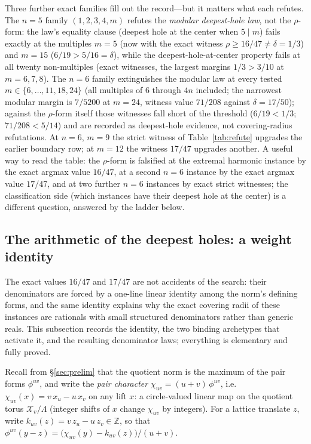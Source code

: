 \documentclass[11pt,a4paper]{article}
\numberwithin{equation}{section}
\theoremstyle{plain}
\theoremstyle{definition}
\theoremstyle{remark}
\newcommand{\Z}{\mathbb{Z}}
\begin{document}
Three further exact families fill out the record---but it matters what
each refutes. The $n=5$ family $(1,2,3,4,m)$ refutes the
\emph{modular deepest-hole law}, not the $\rho$-form: the law's equality
clause (deepest hole at the center when $5\mid m$) fails exactly at the
multiples $m=5$ (now with the exact witness $\rho\ge16/47\ne\delta=1/3$)
and $m=15$ ($6/19>5/16=\delta$), while the deepest-hole-at-center
property fails at all twenty non-multiples (exact witnesses, the largest
margins $1/3>3/10$ at $m=6,7,8$). The $n=6$ family extinguishes the
modular law at every tested $m\in\{6,\dots,11,18,24\}$ (all multiples of
$6$ through $4n$ included; the narrowest modular margin is $7/5200$ at
$m=24$, witness value $71/208$ against $\delta=17/50$); against the
$\rho$-form itself those witnesses fall short of the threshold
($6/19<1/3$; $71/208<5/14$) and are recorded as deepest-hole evidence,
not covering-radius refutations. At $n=6$, $m=9$ the strict witness of
Table~\ref{tab:refute} upgrades the earlier boundary row; at $m=12$ the
witness $17/47$ upgrades another. A useful way to read the table:
the $\rho$-form is falsified at the extremal harmonic instance by the
exact argmax value $16/47$, at a second $n=6$ instance by the exact
argmax value $17/47$, and at
two further $n=6$ instances by exact strict witnesses; the
classification side (which instances have their deepest hole at the
center) is a different question, answered by the ladder below.

\subsection{The arithmetic of the deepest holes: a weight identity}
\label{sec:weights}

The exact values $16/47$ and $17/47$ are not accidents of the search:
their denominators are forced by a one-line linear identity among the
norm's defining forms, and the same identity explains why the exact
covering radii of these instances are rationals with small structured
denominators rather than generic reals. This subsection records the
identity, the two binding archetypes that activate it, and the resulting
denominator laws; everything is elementary and fully proved.

Recall from \S\ref{sec:prelim} that the quotient norm is the maximum of
the pair forms $\phi^{uv}$, and write the \emph{pair character}
$\chi_{uv}=(u{+}v)\,\phi^{uv}$, i.e.\ $\chi_{uv}(x)=v\,x_u-u\,x_v$ on
any lift $x$: a circle-valued linear map on the quotient torus
$\mathcal{X}_v/\Lambda$ (integer shifts of $x$ change $\chi_{uv}$ by
integers). For a lattice translate $z$, write
$k_{uv}(z)=v\,z_u-u\,z_v\in\Z$, so that
$\phi^{uv}(y-z)=\bigl(\chi_{uv}(y)-k_{uv}(z)\bigr)/(u{+}v)$.
\end{document}
